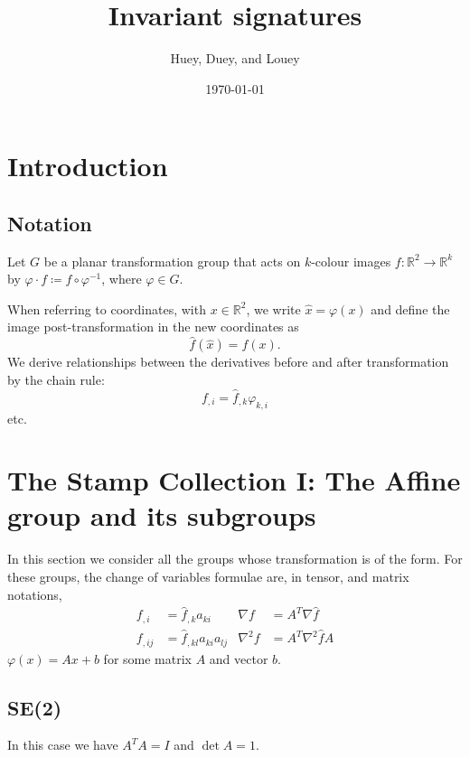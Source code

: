 \documentclass[11pt]{article}
\title{Invariant signatures}
\date{\today}
\author{Huey, Duey, and Louey}
\begin{document}
\maketitle

\section{Introduction}
\subsection{Notation}
Let $G$ be a planar transformation group that acts on $k$-colour images $f
\colon \mathbb{R}^2 \rightarrow \mathbb{R}^k$ by $\varphi \cdot f \coloneqq
f \circ \varphi^{-1}$, where $\varphi \in G$.

When referring to coordinates, with $x \in \mathbb{R}^2$, we write $\hat{x}
= \varphi(x)$  and define the image post-transformation in the new
coordinates as
\begin{equation}
  \hat{f}(\hat{x}) = f(x).
\end{equation}
We derive relationships between the derivatives before and after
transformation by the chain rule:
\begin{equation*}
  f_{, i} = \hat{f}_{,k} \varphi_{k, i} 
\end{equation*}
etc. 





\section{The Stamp Collection I: The Affine group and its subgroups}
In this section we consider all the groups whose transformation is of the
form. For these groups, the change of variables formulae are, in tensor,
and matrix notations,
\begin{align}
  f_{,i} &= \hat{f}_{, k} a_{ki} & \nabla f &= A^T \nabla \hat{f} \\
  f_{,ij} &= \hat{f}_{, kl} a_{ki} a_{lj} & 
  \nabla^2 f &= A^T \nabla^2 \hat{f} A
\end{align}
$\varphi(x) = Ax + b$ for some matrix $A$ and vector $b$.

\subsection{SE(2)}
In this case we have $A^TA = I$ and $\det A = 1$.
\end{document}

